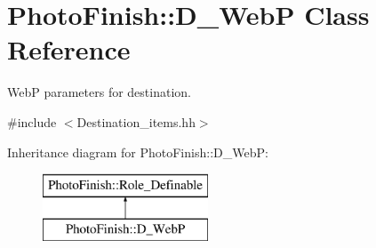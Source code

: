 \hypertarget{class_photo_finish_1_1_d___web_p}{}\section{Photo\+Finish\+:\+:D\+\_\+\+WebP Class Reference}
\label{class_photo_finish_1_1_d___web_p}


WebP parameters for destination.  




{\ttfamily \#include $<$Destination\+\_\+items.\+hh$>$}

Inheritance diagram for Photo\+Finish\+:\+:D\+\_\+\+WebP\+:\begin{figure}[H]
\begin{center}
\leavevmode
\includegraphics[height=2.000000cm]{class_photo_finish_1_1_d___web_p}
\end{center}
\end{figure}
